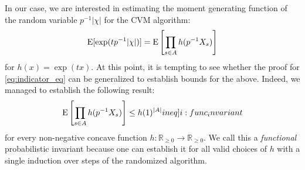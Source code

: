 In our case, we are interested in estimating the moment generating function of the random variable $p^{-1} |\chi|$ for the CVM algorithm:
\[
  \operatorname{\mathrm{E}} [\exp( t p^{-1} |\chi| )] = \operatorname{\mathrm{E}} \left[ \prod_{s \in A} h(p^{-1} X_s) \right]
\]
for $h(x) = \exp(tx)$.
At this point, it is tempting to see whether the proof for \cref{eq:indicator_eq} can be generalized to establish bounds for the above.
Indeed, we managed to establish the following result:
\begin{align}
  \expect \left[ \prod_{s \in A} h(p^{-1} X_s) \right] \leq h(1)^{|A|} \label[ineq]{i:func_invariant}
\end{align}
for every non-negative concave function $h : \mathbb R_{\geq 0} \rightarrow \mathbb R_{\geq 0}$.
We call this a \emph{functional} probabilistic invariant because one can establish it for all valid choices of $h$ with a single induction over steps of the randomized algorithm.

